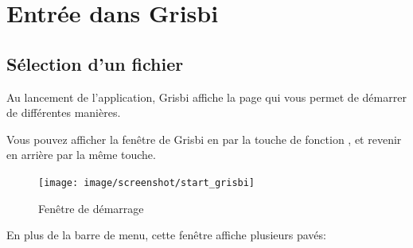 
\chapter{Entrée dans Grisbi\label{entrance}}

\section{Sélection d'un fichier\label{select-file}}


Au lancement de l'application, Grisbi affiche la page qui vous permet de démarrer de différentes manières.


Vous pouvez afficher la fenêtre de Grisbi en  par la touche de fonction , et revenir en arrière par la même touche.			%


\begin{figure}[htbp]			%
	\begin{center}					%
		\texttt{[image: image/screenshot/start\_grisbi]}		%
	\end{center}
	\caption{Fenêtre de démarrage}			%
	\label{start_grisbi}					%
\end{figure}



En plus de la barre de menu, cette fenêtre affiche plusieurs pavés:

